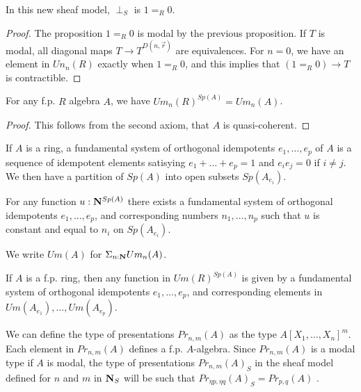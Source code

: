    \begin{proposition}
      In this new sheaf model, $\perp_S$ is $1 =_R 0$.
    \end{proposition}

    \begin{proof}
      The proposition $1=_R0$ is modal by the previous proposition.
      If $T$ is modal, all diagonal maps $T\rightarrow T^{D(n,\vec{r})}$ are equivalences. For $n = 0$, we have
      an element in $Un_n(R)$ exactly when $1=_R0$, and this implies that $(1=_R0)\rightarrow T$ is contractible.
    \end{proof}
    
    \begin{lemma}\label{Um}
      For any f.p. $R$ algebra $A$, we have $Um_n(R)^{Sp(A)} = Um_n(A)$.
    \end{lemma}

    \begin{proof}
      This follows from the second axiom, that $A$ is quasi-coherent.
    \end{proof}

    If $A$ is a ring, a fundamental system of orthogonal idempotents $e_1,\dots,e_p$ of $A$ is a sequence of 
    idempotent elements satisying $e_1+\dots+e_p = 1$ and $e_ie_j = 0$ if $i\neq j$. We then have a partition
    of $Sp(A)$ into open subsets $Sp(A_{e_i})$.

    \begin{lemma}\label{nats}
      For any function $u:\mathbf{N}^{Sp(A)}$ there exists a fundamental system of orthogonal idempotents $e_1,\dots,e_p$, and corresponding
      numbers $n_1,\dots,n_p$ such that $u$ is constant and equal to $n_i$ on $Sp(A_{e_i})$.
    \end{lemma}

    We write $Um(A)$ for $\Sigma_{n:\mathbf{N}}Um_n(A)$.

    \begin{corollary}
      If $A$ is a f.p. ring, then any function in $Um(R)^{Sp(A)}$ is given by
      a fundamental system of orthogonal idempotents $e_1,\dots,e_p$, and corresponding elements in $Um(A_{e_1}),\dots,Um(A_{e_p})$.
    \end{corollary}
    
    We can define the type of presentations $Pr_{n,m}(A)$ as the type $A[X_1,\dots,X_n]^m$. Each element in $Pr_{n,m}(A)$ defines a
    f.p. $A$-algebra. Since $Pr_{n,m}(A)$ is a modal type if $A$ is modal, the type of presentations $Pr_{n,m}(A)_S$ in the sheaf model
    defined for $n$ and $m$ in $\mathbf{N}_S$ will be such that $Pr_{\eta p,\eta q}(A)_S = Pr_{p,q}(A)$ \cite{CRS21}.

